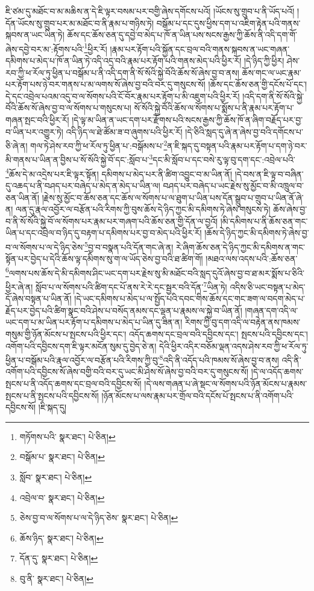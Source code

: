 ཇི་ཙམ་དུ་མཐོང་བ་མ་མཆིས་ན་དེ་ཇི་ལྟར་བསམ་པར་བགྱི་ཞེས་དགོངས་པའོ། །ཡོངས་སུ་གྲུབ་པ་ནི་ཡོད་པའོ། །དོན་ཡོངས་སུ་གྲུབ་པར་མ་མཐོང་བ་ནི་རྣམ་པ་གཉིས་ཏེ། བསྒོམ་པ་དང་དུས་ཕྱིས་དག་པ་འཇིག་རྟེན་པའི་གནས་སྐབས་ན་ཡང་ཡིན་ཏེ། ཆོས་དང་ཆོས་ཅན་དུ་དབྱེ་བ་མེད་པ་ཁོ་ན་ཡིན་པས་སངས་རྒྱས་ཀྱི་ཆོས་ནི་འདི་དག་གོ་ཞེས་དབྱེ་བར་མ་:རྟོགས་པའི་\footnote{གཏོགས་པའི་  སྣར་ཐང་།  པེ་ཅིན། }ཕྱིར་རོ། །རྣམ་པར་རྟོག་པའི་སྐྱོན་དང་བྲལ་བའི་གནས་སྐབས་ན་ཡང་གཞན་དམིགས་པ་མེད་པ་ཁོ་ན་ཡིན་ཏེ་འདི་འདྲ་བའི་རྣམ་པར་རྟོག་པའི་གནས་མེད་པའི་ཕྱིར་རོ། །དེ་ཉིད་ཀྱི་ཕྱིར། ཤེས་རབ་ཀྱི་ཕ་རོལ་ཏུ་ཕྱིན་པ་བསྒོམ་པ་ནི་འདི་དག་ནི་སོ་སོའི་སྐྱེ་བོའི་ཆོས་སོ་ཞེས་བྱ་བ་ནས། ཆོས་གང་ལ་ཡང་རྣམ་པར་རྟོག་པས་ཉེ་བར་གནས་པ་མ་ལགས་སོ་ཞེས་བྱ་བའི་བར་དུ་གསུངས་སོ། །ཆོས་དང་ཆོས་ཅན་གྱི་དངོས་པོ་དང་། དེ་དང་འབྲེལ་པའམ་འདུ་བ་ལ་སོགས་པའི་ངོ་བོར་རྣམ་པར་རྟོག་པ་མི་འཇུག་པའི་ཕྱིར་རོ། །འདི་དག་ནི་སོ་སོའི་སྐྱེ་བོའི་ཆོས་སོ་ཞེས་བྱ་བ་ལ་སོགས་པ་གསུངས་པ། སོ་སོའི་སྐྱེ་བོའི་ཆོས་ལ་སོགས་པ་སྨོས་པ་ནི་རྣམ་པར་རྟོག་པ་གཞན་སྤང་བའི་ཕྱིར་རོ། །དེ་ལྟ་མ་ཡིན་ན་ཡང་དག་པར་རྫོགས་པའི་སངས་རྒྱས་ཀྱི་ཆོས་ཁོ་ན་ཞིག་བརྗོད་པར་བྱ་བ་ཡིན་པར་འགྱུར་ཏེ། འདི་ཉིད་ལ་ཐེ་ཚོམ་ཟ་བ་ཞུགས་པའི་ཕྱིར་རོ། །དེ་ཅིའི་སླད་དུ་ཞེ་ན་ཞེས་བྱ་བའི་དགོངས་པ་ཅི་ཞེ་ན། གལ་ཏེ་ཤེས་རབ་ཀྱི་ཕ་རོལ་ཏུ་ཕྱིན་པ་:བསྒོམས་པ་\footnote{བསྒོམ་པ་  སྣར་ཐང་།  པེ་ཅིན། }ན་ཇི་སྐད་དུ་བསྟན་པའི་རྣམ་པར་རྟོག་པ་དག་ཉེ་བར་མི་གནས་པ་ཡིན་ན་བྱིས་པ་སོ་སོའི་སྐྱེ་བོ་དང་:སློབ་པ་\footnote{སློབ་  སྣར་ཐང་།  པེ་ཅིན། }དང་མི་སློབ་པ་དང་བསེ་རུ་ལྟ་བུ་དག་དང་:འབྲེལ་པའི་\footnote{འབྲེལ་བ་  སྣར་ཐང་།  པེ་ཅིན། }ཆོས་དེ་མ་འདྲེས་པར་ཇི་ལྟར་སྟོན། དམིགས་པ་མེད་པར་ནི་ཚིག་འབྱུང་བ་མ་ཡིན་ནོ། །དེ་བས་ན་ཇི་ལྟ་བ་བཞིན་དུ་འཆད་པ་ནི་བཤད་པར་བཞེད་པ་མེད་ན་མེད་པ་ཡིན་ལ། བཤད་པར་བཞེད་པ་ཡང་རྗེས་སུ་མྱོང་བ་མི་འཁྲུལ་བ་ཅན་ཡིན་ནོ། །རྗེས་སུ་མྱོང་བ་ཆོས་ཅན་དང་ཆོས་ལ་སོགས་པ་ལ་ཐུག་པ་ཡིན་པས་དོན་སྒྲུབ་པ་གྲུབ་པ་ཡིན་ནོ་ཞེ་ན། ལན་དུ་རྣལ་འབྱོར་ལ་བརྩོན་པའི་རིགས་ཀྱི་བུས་ཆོས་དེ་ཉིད་ཀྱང་མི་དམིགས་ཏེ་ཞེས་གསུངས་ཏེ། ཆོས་ཞེས་བྱ་བ་ནི་སོ་སོའི་སྐྱེ་བོ་ལ་སོགས་པར་རྣམ་པར་གཞག་པའི་ཆོས་ཅན་གྱི་དོན་ལ་བྱའོ། །མི་དམིགས་པ་ནི་ཆོས་ཅན་གང་ཡིན་པ་དང་འབྲེལ་བ་ཉིད་དུ་བརྟག་པ་དམིགས་པར་བྱ་བ་མེད་པའི་ཕྱིར་རོ། །ཆོས་དེ་ཉིད་ཀྱང་མི་དམིགས་ཏེ་ཞེས་བྱ་བ་ལ་སོགས་པ་ལ་དེ་ཉིད་ཅེས་\footnote{ཅེས་བྱ་བ་ལ་སོགས་པ་ལ་དེ་ཉིད་ཅེས་  སྣར་ཐང་།  པེ་ཅིན། }བྱ་བ་བསྣན་པའི་དོན་གང་ཞེ་ན། རེ་ཞིག་ཆོས་ཅན་དེ་ཉིད་ཀྱང་མི་དམིགས་ན་གང་སྟོན་པར་བྱེད་པ་དེའི་ཆོས་ལྟ་དམིགས་སུ་ག་ལ་ཡོད་ཅེས་བྱ་བའི་ཐ་ཚིག་གོ། །མཐའ་ལས་འདས་པའི་:ཆོས་ཅན་\footnote{ཆོས་ཉིད་  སྣར་ཐང་།  པེ་ཅིན། }ལགས་པས་ཆོས་དེ་མི་དམིགས་ཤིང་ཡང་དག་པར་རྗེས་སུ་མི་མཐོང་བའི་སླད་དུའོ་ཞེས་བྱ་བ་ཐ་མར་སྨོས་པ་ཅིའི་ཕྱིར་ཞེ་ན། སློབ་པ་ལ་སོགས་པའི་ཚིག་དང་པོ་ནས་རེ་རེ་དང་སྦྱར་བའི་དོན་\footnote{དོན་དུ་  སྣར་ཐང་།  པེ་ཅིན། }ཡིན་ཏེ། འདིས་ཅི་ཡང་བསྟན་པ་མེད་དོ་ཞེས་བསྟན་པ་ཡིན་ནོ། །དེ་ཡང་དམིགས་པ་མེད་པ་ལ་སྤྱོད་པའི་དབང་གིས་ཆོས་དང་གང་ཟག་ལ་བདག་མེད་པ་རྗོད་པར་བྱེད་པའི་ཚིག་སྣང་བའི་ཤེས་པ་བསོད་ནམས་དང་ལྡན་པ་རྣམས་ལ་སྐྱེ་བ་ཡིན་ནོ། །གཞན་དག་འདི་ལ་ཡང་དག་པ་མ་ཡིན་པར་རྟོག་པ་དམིགས་པ་མེད་པ་ཡིན་དུ་ཟིན་ན། རིགས་ཀྱི་བུ་དག་འདི་ལ་བརྟེན་ནས་ཁམས་གསུམ་གྱི་ཉོན་མོངས་པ་སྤངས་པའི་ཕྱིར་དང་། འདོད་ཆགས་དང་བྲལ་བའི་དབྱིངས་དང་། སྤངས་པའི་དབྱིངས་དང་། འགོག་པའི་དབྱིངས་དག་ཇི་ལྟར་མངོན་སུམ་དུ་བྱེད་ཅེ་ན། དེའི་ཕྱིར་འདིར་བཅོམ་ལྡན་འདས་ཤེས་རབ་ཀྱི་ཕ་རོལ་ཏུ་ཕྱིན་པ་བསྒོམ་པའི་རྣལ་འབྱོར་ལ་བརྩོན་པའི་རིགས་ཀྱི་བུ་\footnote{བུ་ནི་  སྣར་ཐང་།  པེ་ཅིན། }འདི་ནི་འདོད་པའི་ཁམས་སོ་ཞེས་བྱ་བ་ནས། འདི་ནི་འགོག་པའི་དབྱིངས་སོ་ཞེས་བགྱི་བའི་བར་དུ་ཡང་མི་ཤེས་སོ་ཞེས་བྱ་བའི་བར་དུ་གསུངས་སོ། །དེ་ལ་འདོད་ཆགས་སྤངས་པ་ནི་འདོད་ཆགས་དང་བྲལ་བའི་དབྱིངས་སོ། །དེ་ལས་གཞན་པ་ཞེ་སྡང་ལ་སོགས་པའི་ཉོན་མོངས་པ་རྣམས་སྤངས་པ་ནི་སྤངས་པའི་དབྱིངས་སོ། །ཉོན་མོངས་པ་ལས་རྣམ་པར་གྲོལ་བའི་དངོས་པོ་སྤངས་པ་ནི་འགོག་པའི་དབྱིངས་སོ། །ཇི་སྐད་དུ། 